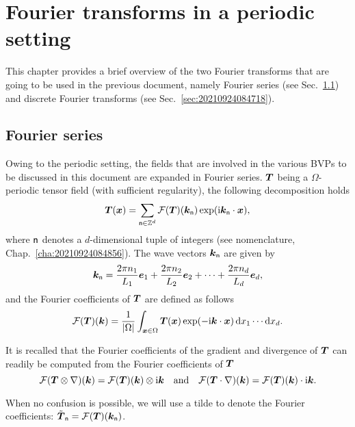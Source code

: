 \chapter{Fourier transforms in a periodic setting}

This chapter provides a brief overview of the two Fourier transforms that are
going to be used in the previous document, namely Fourier series (see
Sec.~\ref{sec:20210924084626}) and discrete Fourier transforms (see
Sec.~\ref{sec:20210924084718}).

\section{Fourier series}
\label{sec:20210924084626}

Owing to the periodic setting, the fields that are involved in the various BVPs
to be discussed in this document are expanded in Fourier series. \(\boldsymbol T\)
being a \(\Omega\)-periodic tensor field (with sufficient regularity), the
following decomposition holds
\begin{equation}
  \boldsymbol T(\boldsymbol x)
  =\sum_{\mathsf{n}\in\mathbb Z^d}\mathcal F(\boldsymbol T)(\boldsymbol k_{\mathsf{n}})
  \exp(\mathrm i\boldsymbol k_{\mathsf{n}}\cdot\boldsymbol x),
\end{equation}
where \(\mathsf{n}\) denotes a \(d\)-dimensional tuple of integers (see
nomenclature, Chap.~\ref{cha:20210924084856}). The wave vectors
\(\boldsymbol k_{\mathsf{n}}\) are given by
\begin{equation}
  \boldsymbol k_{\mathsf{n}}=\frac{2\pi n_1}{L_1}\boldsymbol e_1
  +\frac{2\pi n_2}{L_2}\boldsymbol e_2
  +\cdots+\frac{2\pi n_d}{L_d}\boldsymbol e_d,
\end{equation}
and the Fourier coefficients of \(\boldsymbol T\) are defined as follows
\begin{equation}
\mathcal F(\boldsymbol T)(\boldsymbol k)=\frac1{\lvert\Omega\rvert}\int_{\boldsymbol x\in\Omega}
\boldsymbol T(\boldsymbol x)\exp(-\mathrm i\boldsymbol k\cdot\boldsymbol x)\,\mathrm d x_1\cdots\mathrm d x_d.
\end{equation}

It is recalled that the Fourier coefficients of the gradient and divergence of
\(\boldsymbol T\) can readily be computed from the Fourier coefficients of \(\boldsymbol T\)
\begin{equation}
\mathcal F(\boldsymbol T\otimes\nabla)(\boldsymbol k)=\mathcal F(\boldsymbol T)(\boldsymbol k)\otimes\mathrm i\boldsymbol k
\quad\text{and}\quad
\mathcal F(\boldsymbol T\cdot\nabla)(\boldsymbol k)=\mathcal F(\boldsymbol T)(\boldsymbol k)\cdot\mathrm i\boldsymbol k.
\end{equation}

When no confusion is possible, we will use a tilde to denote the Fourier
coefficients:
\(\tilde{\boldsymbol T}_\mathsf{n}=\mathcal F(\boldsymbol T)(\boldsymbol k_\mathsf{n})\).

